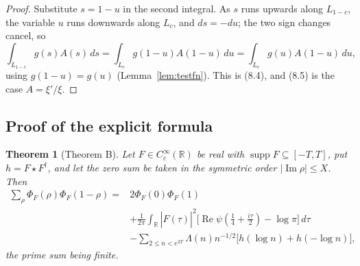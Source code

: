 \documentclass[11pt]{amsart}
\newtheorem{theorem}{Theorem}[section]
\theoremstyle{definition}
\theoremstyle{remark}
\newcommand{\R}{\mathbb R}
\newcommand{\Rel}{\operatorname{Re}}
\newcommand{\Iml}{\operatorname{Im}}
\newcommand{\supp}{\operatorname{supp}}
\begin{document}
\begin{proof}
Substitute $s=1-u$ in the second integral.  As $s$ runs upwards along
$L_{1-c}$, the variable $u$ runs downwards along $L_c$, and $ds=-du$; the two
sign changes cancel, so
\[
  \int_{L_{1-c}}g(s)A(s)\,ds=\int_{L_c}g(1-u)A(1-u)\,du
  =\int_{L_c}g(u)A(1-u)\,du ,
\]
using $g(1-u)=g(u)$ (Lemma~\ref{lem:testfn}).  This is (8.4), and (8.5) is the
case $A=\xi'/\xi$.
\end{proof}

\subsection{Proof of the explicit formula}

\begin{theorem}[Theorem B]
\label{thm:EF}
Let $F\in C_c^\infty(\R)$ be real with $\supp F\subseteq[-T,T]$, put
$h=F\star F^\dagger$, and let the zero sum be taken in the symmetric order
$|\Iml\rho|\le X$.  Then
\begin{equation}
\begin{aligned}
  \sum_\rho\Phi_F(\rho)\Phi_F(1-\rho)
  ={}&2\Phi_F(0)\Phi_F(1)\\
  &+\frac1{2\pi}\int_\R|\hat F(\tau)|^2
     \bigl[\Rel\psi(\tfrac14+\tfrac{i\tau}2)-\log\pi\bigr]\,d\tau\\
  &-\sum_{2\le n<e^{2T}}\Lambda(n)n^{-1/2}
     \bigl[h(\log n)+h(-\log n)\bigr],
\end{aligned}
\tag{8.6}
\end{equation}
the prime sum being finite.
\end{theorem}
\end{document}

